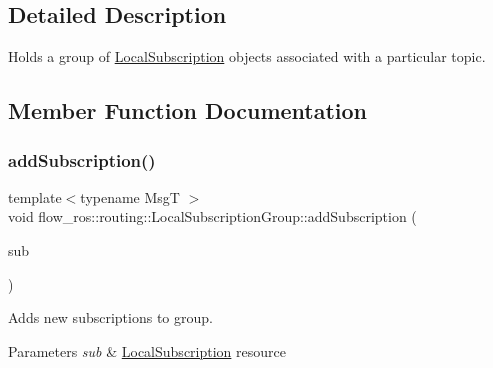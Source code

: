 \subsection{Detailed Description}
Holds a group of \hyperlink{classflow__ros_1_1routing_1_1_local_subscription}{Local\+Subscription} objects associated with a particular topic. 

\subsection{Member Function Documentation}
\mbox{\label{classflow__ros_1_1routing_1_1_local_subscription_group_ab6feb50cfaff51aae2b06da8b95a355a}} 
\subsubsection{\texorpdfstring{add\+Subscription()}{addSubscription()}}
{\footnotesize\ttfamily template$<$typename MsgT $>$ \\
void flow\+\_\+ros\+::routing\+::\+Local\+Subscription\+Group\+::add\+Subscription (\begin{DoxyParamCaption}\item[{std\+::shared\+\_\+ptr$<$ \hyperlink{classflow__ros_1_1routing_1_1_local_subscription}{Local\+Subscription}$<$ MsgT $>$$>$}]{sub }\end{DoxyParamCaption})\hspace{0.3cm}{\ttfamily [inline]}}



Adds new subscriptions to group. 


\begin{DoxyParams}{Parameters}
{\em sub} & \hyperlink{classflow__ros_1_1routing_1_1_local_subscription}{Local\+Subscription} resource \\
\hline
\end{DoxyParams}
\mbox{\label{classflow__ros_1_1routing_1_1_local_subscription_group_af8ee0436491f90218fd94b088dd170ee}} 
